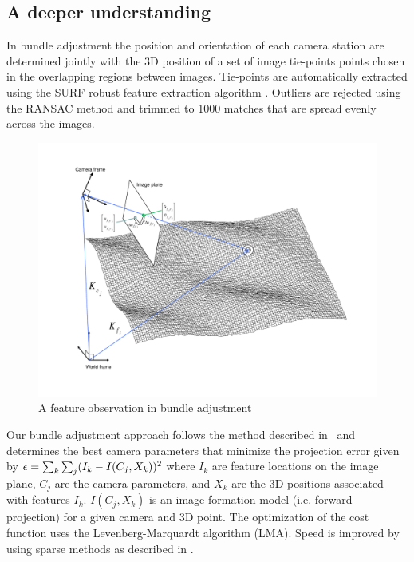 \subsection{A deeper understanding}

In bundle adjustment the position and orientation of each camera station are
determined jointly with the 3D position of a set of image tie-points
points chosen in the overlapping regions between images.
Tie-points are automatically extracted using the SURF robust feature
extraction algorithm \citep{surf08}.  Outliers are rejected using
the RANSAC method and trimmed to 1000 matches that are spread evenly
across the images.

\begin{figure}[b!]
  \begin{center}
  \includegraphics[trim=20mm 20mm 20mm 15mm,clip,width=6in]{images/ba_feature_observation.pdf}
  \end{center}
  \caption{ A feature observation in bundle adjustment \citep{moore09} }
  \label{fig:ba_feature}
\end{figure}

Our bundle adjustment approach follows the method described
in~\cite{triggs00} and determines the best camera
parameters that minimize the projection error given by ${\bf \epsilon}
= \sum_k\sum_j(I_k-I(C_j, X_k))^2$ where $I_k$ are feature locations
on the image plane, $C_j$ are the camera parameters, and $X_k$ are the
3D positions associated with features $I_k$. $I(C_j, X_k)$ is an image
formation model (i.e. forward projection) for a given camera and 3D
point.  The optimization of the cost function uses the
Levenberg-Marquardt algorithm (LMA). Speed is improved by using sparse
methods as described in \citet{hartley04}.

